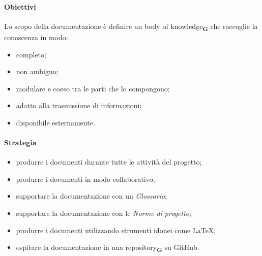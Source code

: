 \paragraph{Obiettivi}
Lo scopo della documentazione è definire un body of knowledge\textsubscript{\textbf{G}} che raccoglie la conoscenza in modo:
\begin{itemize}
    \item completo;
    \item non ambiguo;
    \item modulare e coeso tra le parti che lo compongono;
    \item adatto alla trasmissione di informazioni;
    \item disponibile esternamente.
\end{itemize}
\paragraph{Strategia}
\begin{itemize}
    \item produrre i documenti durante tutte le attività del progetto;
    \item produrre i documenti in modo collaborativo;
    \item supportare la documentazione con un \textit{Glossario};
    \item supportare la documentazione con le \textit{Norme di progetto};
    \item produrre i documenti utilizzando strumenti idonei come LaTeX;
    \item ospitare la documentazione in una repository\textsubscript{\textbf{G}} su GitHub.
\end{itemize}
